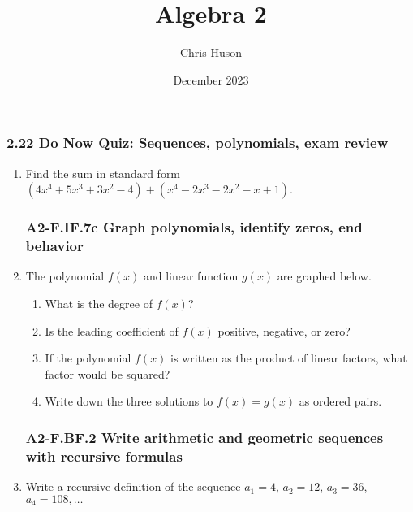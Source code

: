 \documentclass[12pt, twoside]{article}
\title{Algebra 2}
\author{Chris Huson}
\date{December 2023}
\begin{document}
\subsubsection*{2.22 Do Now Quiz: Sequences, polynomials, exam review}
\begin{enumerate}

\subsubsection*{A2-APR.1 Perform operations with polynomials}
\item Find the sum in standard form $(4x^4+5x^3+3x^2-4) + (x^4-2x^3-2x^2-x+1)$. \vspace{3cm}

\subsubsection*{A2-F.IF.7c Graph polynomials, identify zeros, end behavior}
\item The polynomial $f(x)$ and linear function $g(x)$ are graphed below. 
\begin{multicols}{2}
    \begin{enumerate}[itemsep=0.6cm]
        \item What is the degree of $f(x)$?
        \item Is the leading coefficient of $f(x)$ positive, negative, or zero?
        \item If the polynomial $f(x)$ is written as the product of linear factors, what factor would be squared?
        \item Write down the three solutions to $f(x)=g(x)$ as ordered pairs.
    \end{enumerate} \vspace{1cm} \;

    \columnbreak

\end{multicols}

\subsubsection*{A2-F.BF.2 Write arithmetic and geometric sequences with recursive formulas}
\item Write a recursive definition of the sequence $a_1 = 4$, $a_2 = 12$, $a_3 = 36$, $a_4 = 108, \ldots$

\end{enumerate}
\end{document}
